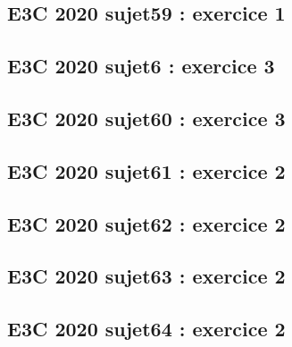 \documentclass[lang=fr,edition=teacher,layout=sheet]{mxbook}
\begin{document}
\begingroup\endgroup
\par\bigskip
{}\subsection*{E3C 2020 sujet59 : exercice 1}
\begingroup\endgroup
\par\bigskip
{}\subsection*{E3C 2020 sujet6 : exercice 3}
\begingroup\endgroup
\par\bigskip
{}\subsection*{E3C 2020 sujet60 : exercice 3}
\begingroup\endgroup
\par\bigskip
{}\subsection*{E3C 2020 sujet61 : exercice 2}
\begingroup\endgroup
\par\bigskip
{}\subsection*{E3C 2020 sujet62 : exercice 2}
\begingroup\endgroup
\par\bigskip
{}\subsection*{E3C 2020 sujet63 : exercice 2}
\begingroup\endgroup
\par\bigskip
{}\subsection*{E3C 2020 sujet64 : exercice 2}
\begingroup\endgroup
\end{document}
